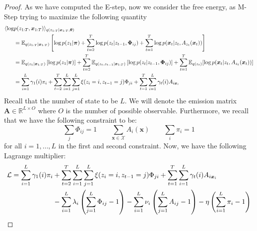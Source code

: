 \begin{proof}
    As we have computed the E-step, now we consider the free energy, as M-Step trying to maximize the following quantity 
    \begin{equation*}
    \begin{aligned}
        \langle\log &p(z_{1:T}, \boldsymbol x_{1:T})\rangle_{q(z_{1:T} | \boldsymbol x_{1:T}, \boldsymbol \theta)} \\
        &= \mathbb{E}_{q(z_{1:T} | \boldsymbol x_{1:T})}\left[ \log p(z_1 | \boldsymbol \pi) + \sum^T_{t=2} \log p(z_t | z_{t-1} , \boldsymbol \Phi_{ij}) + \sum^T_{t=1} \log p(\boldsymbol x_t | z_t, A_{z_t}(\boldsymbol x_t))  \right] \\
        &= \mathbb{E}_{q(z_1|\boldsymbol x_{1:T})}\left[ \log p(z_1 | \boldsymbol \pi) \right] + \sum^T_{t=2} \mathbb{E}_{q(z_t, z_{t-1} | \boldsymbol x_{1:T})}\left[ \log p(z_t | z_{t-1} , \boldsymbol \Phi_{ij})  \right]+ \sum^T_{t=1} \mathbb{E}_{q(z_t)}[\log p(\boldsymbol x_t | z_t, A_{z_t}(\boldsymbol x_t))]  \\
        &= \sum^L_{i=1}\gamma_1(i)\pi_i + \sum^T_{t=2} \sum^L_{i=1}\sum_{j=1}^L\xi(z_i = i, z_{t-1}=j) \Phi_{ji} + \sum^T_{t=1} \sum^L_{i=1}\gamma_t(i)A_{i\boldsymbol x_i}  \\
    \end{aligned}
    \end{equation*}
    Recall that the number of state to be $L$. We will denote the emission matrix $\boldsymbol A \in \mathbb{R}^{L \times O}$ where $O$ is the number of possible observable. Furthermore, we recall that we have the following constraint to be:
    \begin{equation*}
        \sum_j \Phi_{ij} = 1 \qquad \sum_{\boldsymbol x \in \mathcal{X}} A_i(\boldsymbol x)  \qquad \sum_i \pi_i = 1
    \end{equation*}
    for all $i=1,\dots,L$ in the first and second constraint. Now, we have the following Lagrange multiplier:
    \begin{equation*}
    \begin{aligned}
        \mathcal{L} = \sum^L_{i=1}\gamma_1(i)\pi_i &+ \sum^T_{t=2} \sum^L_{i=1}\sum_{j=1}^L\xi(z_i = i, z_{t-1}=j) \Phi_{ji} + \sum^T_{t=1} \sum^L_{i=1}\gamma_t(i)A_{i\boldsymbol x_i}  \\
        &-\sum^L_{i=1}\lambda_i\left( \sum^L_{j=1}\Phi_{ij} - 1 \right) -\sum^L_{i=1}\nu_i\left( \sum^L_{j=1}A_{ij} - 1 \right) - \eta\left( \sum^L_{i=1}\pi_i - 1 \right)
    \end{aligned}
    \end{equation*}

\end{proof}
